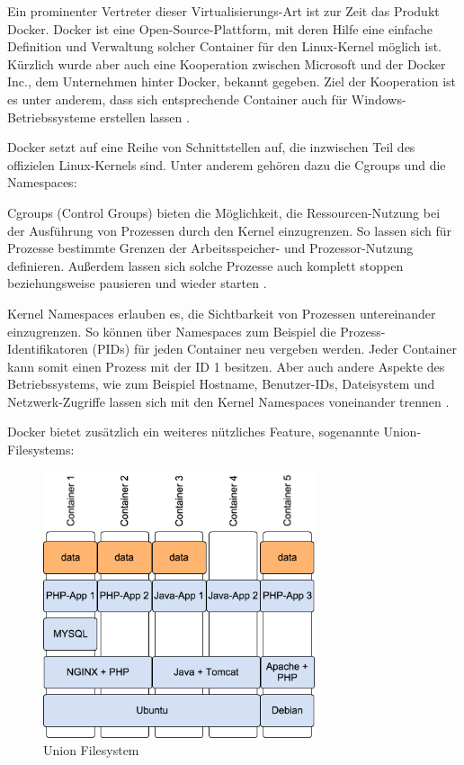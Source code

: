 Ein prominenter Vertreter dieser Virtualisierungs-Art ist zur Zeit das Produkt Docker. Docker ist eine Open-Source-Plattform, mit deren Hilfe eine einfache Definition und Verwaltung solcher Container für den Linux-Kernel möglich ist. Kürzlich wurde aber auch eine Kooperation zwischen Microsoft und der Docker Inc., dem Unternehmen hinter Docker, bekannt gegeben. Ziel der Kooperation ist es unter anderem, dass sich entsprechende Container auch für Windows-Betriebssysteme erstellen lassen \citep[Vgl.][]{heise:001}.

Docker setzt auf eine Reihe von Schnittstellen auf, die inzwischen Teil des offizielen Linux-Kernels sind. Unter anderem gehören dazu die Cgroups und die Namespaces:

Cgroups (Control Groups) bieten die Möglichkeit, die Ressourcen-Nutzung bei der Ausführung von Prozessen durch den Kernel einzugrenzen. So lassen sich für Prozesse bestimmte Grenzen der Arbeitsspeicher- und Prozessor-Nutzung definieren. Außerdem lassen sich solche Prozesse auch komplett stoppen beziehungsweise pausieren und wieder starten \citep[Vgl.][S. 3]{Schee14}.

Kernel Namespaces erlauben es, die Sichtbarkeit von Prozessen untereinander einzugrenzen. So können über Namespaces zum Beispiel die Prozess-Identifikatoren (PIDs) für jeden Container neu vergeben werden. Jeder Container kann somit einen Prozess mit der ID 1 besitzen. Aber auch andere Aspekte des Betriebssystems, wie zum Beispiel Hostname, Benutzer-IDs, Dateisystem und Netzwerk-Zugriffe lassen sich mit den Kernel Namespaces voneinander trennen \citep[Vgl.][S. 3]{Schee14}.

Docker bietet zusätzlich ein weiteres nützliches Feature, sogenannte Union-Filesystems:

\begin{figure}[!ht]
  \begin{center}
    \includegraphics[width=8cm]{bilder/UnionFilesystem.png}
    \caption{Union Filesystem}
    \label{Union Filesystem}
  \end{center}
\end{figure}

